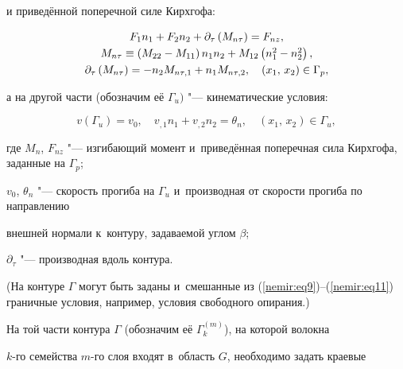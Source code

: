 и приведённой поперечной силе Кирхгофа:

\begin{equation}

\label{nemir:eq10}

\begin{array}{c}

F_1 n_1 + F_2 n_2 + \partial _\tau \left( M_{n\tau }  \right) = F_{nz},\vspace{1mm}\\

M_{n\tau } \equiv \left( M_{22} - M_{11} \right)n_1 n_2 +  M_{12} \left( n_1^2 - n_2^2  \right),\vspace{1mm}\\

\partial _\tau \left(M_{n\tau }  \right) = - n_2 M_{n\tau ,1} + n_1 M_{n\tau ,2},\quad 

(x_1 ,\,x_2 ) \in \Gamma _p , 

\end{array}

\end{equation}

а на другой части (обозначим её $\Gamma _u )$ "--- кинематические условия:

\begin{equation}

\label{nemir:eq11}

v( \Gamma _u ) = v_0 ,\quad 

v_{,1} n_1 + v_{,2} n_2 = \theta _n,\quad (x_1 ,\,x_2 ) \in \Gamma _u ,

\end{equation}

где $M_n$, $F_{nz} $ "--- изгибающий момент и~приведённая поперечная сила Кирхгофа, заданные на $\Gamma _p $; 

$v_0$, $\theta _n $ "--- скорость прогиба на $\Gamma _u $ и~производная от скорости прогиба по направлению 

внешней нормали к~контуру, задаваемой углом $\beta $; 

$\partial _\tau $ "--- производная вдоль контура. 

(На контуре $\Gamma$ могут быть заданы и~смешанные из (\ref{nemir:eq9})--(\ref{nemir:eq11}) граничные условия, например, условия свободного опирания.)



На той части контура $\Gamma$ (обозначим её $\Gamma _k^{(m)}$), на которой волокна 

$k$-го семейства $m$-го слоя входят в~область $G$, необходимо задать краевые 

